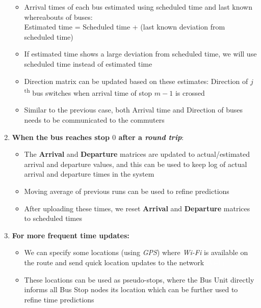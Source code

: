 \begin{enumerate}
          \begin{itemize}
              \item Arrival times of each bus estimated using scheduled time and last known whereabouts of buses:\\
                    Estimated time = Scheduled time + (last known deviation from scheduled
                    time)
              \item If estimated time shows a large deviation from scheduled time, we will use scheduled time instead of estimated time
              \item Direction matrix can be updated based on these estimates: Direction of $j$\textsuperscript{th} bus switches when arrival time of stop $m-1$ is crossed
              \item Similar to the previous case, both Arrival time and Direction of buses needs to be communicated to the commuters
          \end{itemize}
    \item \textbf{When the bus reaches stop \textbf{$0$} after a \textit{\gls{round trip}}}:
          \begin{itemize}
              \item  The \textbf{Arrival} and \textbf{Departure} matrices are updated to actual/estimated arrival and departure values, and this can be used to keep log of actual arrival and departure times in the system
              \item Moving average of previous runs can be used to refine predictions
              \item  After uploading these times, we reset \textbf{Arrival} and \textbf{Departure} matrices to scheduled times
          \end{itemize}
    \item \textbf{For more frequent time updates:}
          \begin{itemize}
              \item We can specify some locations (using \textit{\gls{GPS}}) where \textit{\gls{Wi-Fi}} is available on the route and send quick location updates to the network {\tiny \textcolor{white}{\ac{Wi-Fi}}}
              \item These locations can be used as pseudo-stops, where the Bus Unit directly informs all Bus Stop nodes its location which can be further used to refine time predictions
          \end{itemize}
\end{enumerate}